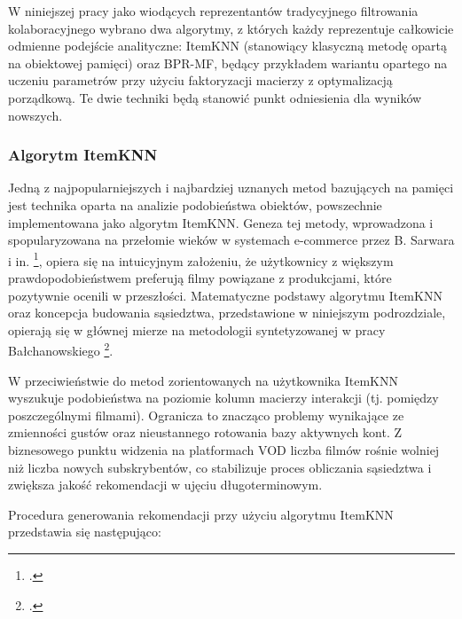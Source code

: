 W niniejszej pracy jako wiodących reprezentantów tradycyjnego filtrowania kolaboracyjnego wybrano dwa algorytmy, z których każdy reprezentuje całkowicie odmienne podejście analityczne: ItemKNN (stanowiący klasyczną metodę opartą na obiektowej pamięci) oraz BPR-MF, będący przykładem wariantu opartego na uczeniu parametrów przy użyciu faktoryzacji macierzy z optymalizacją porządkową. Te dwie techniki będą stanowić punkt odniesienia dla wyników nowszych.

\subsubsection{Algorytm ItemKNN} %

Jedną z najpopularniejszych i najbardziej uznanych metod bazujących na pamięci jest technika oparta na analizie podobieństwa obiektów, powszechnie implementowana jako algorytm ItemKNN. Geneza tej metody, wprowadzona i spopularyzowana na przełomie wieków w systemach e-commerce przez B. Sarwara i in. \footcite{sarwarItembasedCollaborativeFiltering2001}, opiera się na intuicyjnym założeniu, że użytkownicy z większym prawdopodobieństwem preferują filmy powiązane z produkcjami, które pozytywnie ocenili w przeszłości. Matematyczne podstawy algorytmu ItemKNN oraz koncepcja budowania sąsiedztwa, przedstawione w niniejszym podrozdziale, opierają się w głównej mierze na metodologii syntetyzowanej w pracy Bałchanowskiego \footcite[16-17]{balchanowskiEwolucyjnaAgregacjaRang2023}.

W przeciwieństwie do metod zorientowanych na użytkownika ItemKNN wyszukuje podobieństwa na poziomie kolumn macierzy interakcji (tj. pomiędzy poszczególnymi filmami). Ogranicza to znacząco problemy wynikające ze zmienności gustów oraz nieustannego rotowania bazy aktywnych kont. Z biznesowego punktu widzenia na platformach VOD liczba filmów rośnie wolniej niż liczba nowych subskrybentów, co stabilizuje proces obliczania sąsiedztwa i zwiększa jakość rekomendacji w ujęciu długoterminowym.

Procedura generowania rekomendacji przy użyciu algorytmu ItemKNN przedstawia się następująco:


